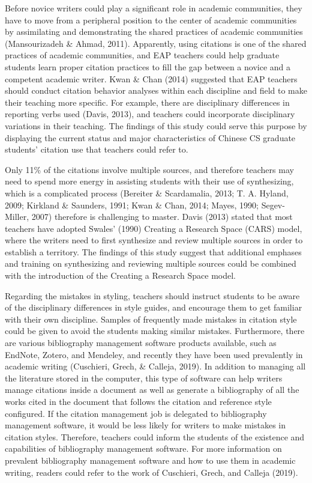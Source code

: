 Before novice writers could play a significant role in academic communities, they have to move from a peripheral position to the center of academic communities by assimilating and demonstrating the shared practices of academic communities (Mansourizadeh \& Ahmad, 2011). Apparently, using citations is one of the shared practices of academic communities, and EAP teachers could help graduate students learn proper citation practices to fill the gap between a novice and a competent academic writer. Kwan \& Chan (2014) suggested that EAP teachers should conduct citation behavior analyses within each discipline and field to make their teaching more specific. For example, there are disciplinary differences in reporting verbs used (Davis, 2013), and teachers could incorporate disciplinary variations in their teaching. The findings of this study could serve this purpose by displaying the current status and major characteristics of Chinese CS graduate students’ citation use that teachers could refer to.

Only 11\% of the citations involve multiple sources, and therefore teachers may need to spend more energy in assisting students with their use of synthesizing, which is a complicated process (Bereiter \& Scardamalia, 2013; T. A. Hyland, 2009; Kirkland \& Saunders, 1991; Kwan \& Chan, 2014; Mayes, 1990; Segev-Miller, 2007) therefore is challenging to master. Davis (2013) stated that most teachers have adopted Swales’ (1990) Creating a Research Space (CARS) model, where the writers need to first synthesize and review multiple sources in order to establish a territory. The findings of this study suggest that additional emphases and training on synthesizing and reviewing multiple sources could be combined with the introduction of the Creating a Research Space model.

Regarding the mistakes in styling, teachers should instruct students to be aware of the disciplinary differences in style guides, and encourage them to get familiar with their own discipline. Samples of frequently made mistakes in citation style could be given to avoid the students making similar mistakes. Furthermore, there are various bibliography management software products available, such as EndNote, Zotero, and Mendeley, and recently they have been used prevalently in academic writing (Cuschieri, Grech, \& Calleja, 2019). In addition to managing all the literature stored in the computer, this type of software can help writers manage citations inside a document as well as generate a bibliography of all the works cited in the document that follows the citation and reference style configured. If the citation management job is delegated to bibliography management software, it would be less likely for writers to make mistakes in citation styles. Therefore, teachers could inform the students of the existence and capabilities of bibliography management software. For more information on prevalent bibliography management software and how to use them in academic writing, readers could refer to the work of Cuschieri, Grech, and Calleja (2019).

